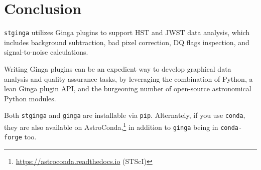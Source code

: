 \documentclass[11pt,twoside]{article}
\begin{document}
\section{Conclusion}

{\tt stginga} utilizes Ginga plugins to support HST and JWST data analysis,
which includes background subtraction, bad pixel correction, DQ flags
inspection, and signal-to-noise calculations.

Writing Ginga plugins can be an expedient way to develop graphical data
analysis and quality assurance tasks, by leveraging the combination of
Python, a lean Ginga plugin API, and the burgeoning number of open-source
astronomical Python modules.

Both {\tt stginga} and {\tt ginga} are installable via {\tt pip}. Alternately,
if you use {\tt conda}, they are also available on
AstroConda,\footnote{\url{https://astroconda.readthedocs.io} (STScI)}
in addition to {\tt ginga} being in  {\tt conda-forge} too.


\end{document}
